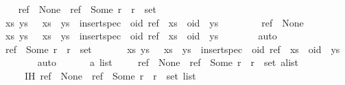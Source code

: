 \begin{isabellebody}
\ \ \isamarkupfalse%
\ {\isachardoublequoteopen}ref\ {\isacharequal}\ None\ {\isasymor}\ ref\ {\isacharequal}\ Some\ r\ {\isasymand}\ r\ {\isasymin}\ set\ {\isacharbrackleft}{\isacharbrackright}{\isachardoublequoteclose}\isanewline
\ \ \isamarkupfalse%
\ {\isachardoublequoteopen}{\isasymexists}xs\ ys{\isachardot}\ {\isacharbrackleft}{\isacharbrackright}\ {\isacharequal}\ xs\ {\isacharat}\ ys\ {\isasymand}\ insert{\isacharunderscore}spec\ {\isacharbrackleft}{\isacharbrackright}\ {\isacharparenleft}oid{\isacharcomma}\ ref{\isacharparenright}\ {\isacharequal}\ xs\ {\isacharat}\ oid\ {\isacharhash}\ ys{\isachardoublequoteclose}\isanewline
\ \ \isamarkupfalse%
\isanewline
\ \ \ \ \isamarkupfalse%
\ {\isachardoublequoteopen}ref\ {\isacharequal}\ None{\isachardoublequoteclose}\isanewline
\ \ \ \ \isamarkupfalse%
\ {\isachardoublequoteopen}{\isasymexists}xs\ ys{\isachardot}\ {\isacharbrackleft}{\isacharbrackright}\ {\isacharequal}\ xs\ {\isacharat}\ ys\ {\isasymand}\ insert{\isacharunderscore}spec\ {\isacharbrackleft}{\isacharbrackright}\ {\isacharparenleft}oid{\isacharcomma}\ ref{\isacharparenright}\ {\isacharequal}\ xs\ {\isacharat}\ oid\ {\isacharhash}\ ys{\isachardoublequoteclose}\isanewline
\ \ \ \ \ \ \isamarkupfalse%
\ auto\isanewline
\ \ \isamarkupfalse%
\isanewline
\ \ \ \ \isamarkupfalse%
\ {\isachardoublequoteopen}ref\ {\isacharequal}\ Some\ r\ {\isasymand}\ r\ {\isasymin}\ set\ {\isacharbrackleft}{\isacharbrackright}{\isachardoublequoteclose}\isanewline
\ \ \ \ \isamarkupfalse%
\ {\isachardoublequoteopen}{\isasymexists}xs\ ys{\isachardot}\ {\isacharbrackleft}{\isacharbrackright}\ {\isacharequal}\ xs\ {\isacharat}\ ys\ {\isasymand}\ insert{\isacharunderscore}spec\ {\isacharbrackleft}{\isacharbrackright}\ {\isacharparenleft}oid{\isacharcomma}\ ref{\isacharparenright}\ {\isacharequal}\ xs\ {\isacharat}\ oid\ {\isacharhash}\ ys{\isachardoublequoteclose}\isanewline
\ \ \ \ \ \ \isamarkupfalse%
\ auto\isanewline
\ \ \isamarkupfalse%
\isanewline
{}\isamarkupfalse%
\isanewline
\ \ \isamarkupfalse%
\ a\ list\isanewline
\ \ \isamarkupfalse%
\ {}{\isacharcolon}\ {\isachardoublequoteopen}ref\ {\isacharequal}\ None\ {\isasymor}\ ref\ {\isacharequal}\ Some\ r\ {\isasymand}\ r\ {\isasymin}\ set\ {\isacharparenleft}a{\isacharhash}list{\isacharparenright}{\isachardoublequoteclose}\isanewline
\ \ \ \ \ IH{\isacharcolon}\ {\isachardoublequoteopen}ref\ {\isacharequal}\ None\ {\isasymor}\ ref\ {\isacharequal}\ Some\ r\ {\isasymand}\ r\ {\isasymin}\ set\ list\ {\isasymLongrightarrow}\isanewline

\end{isabellebody}
